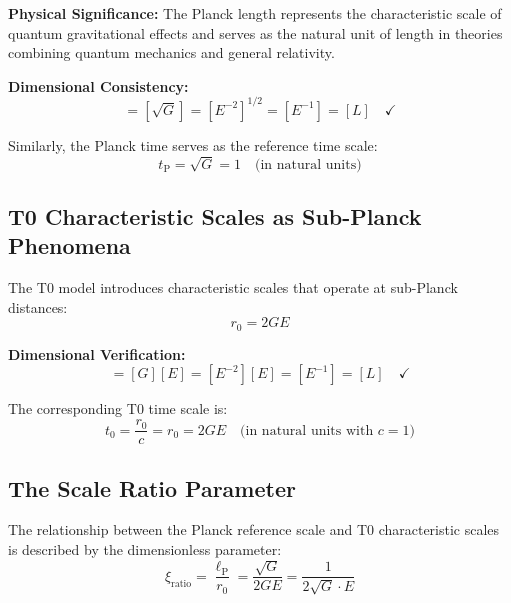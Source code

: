 \documentclass[12pt,a4paper]{report}
\newcommand{\lP}{\ell_{\text{P}}}         %
\newcommand{\tP}{t_{\text{P}}}            %
\newcommand{\rzero}{r_0}                  %
\newcommand{\tzero}{t_0}                  %
\newcommand{\xirat}{\xi_{\text{ratio}}}   %
\begin{document}
	\textbf{Physical Significance:} The Planck length represents the characteristic scale of quantum gravitational effects and serves as the natural unit of length in theories combining quantum mechanics and general relativity.
	
	\textbf{Dimensional Consistency:}
	\begin{equation}
		[\lP] = [\sqrt{G}] = [E^{-2}]^{1/2} = [E^{-1}] = [L] \quad \checkmark
	\end{equation}
	
	Similarly, the Planck time serves as the reference time scale:
	\begin{equation}
		\tP = \sqrt{G} = 1 \quad \text{(in natural units)}
	\end{equation}
	
	\subsection{T0 Characteristic Scales as Sub-Planck Phenomena}\label{subsec:t0_sub_planck}
	
	The T0 model introduces characteristic scales that operate at sub-Planck distances:
	\begin{equation}
		\boxed{\rzero = 2GE}
		\label{eq:t0_characteristic_length}
	\end{equation}
	
	\textbf{Dimensional Verification:}
	\begin{equation}
		[\rzero] = [G][E] = [E^{-2}][E] = [E^{-1}] = [L] \quad \checkmark
	\end{equation}
	
	The corresponding T0 time scale is:
	\begin{equation}
		\tzero = \frac{\rzero}{c} = \rzero = 2GE \quad \text{(in natural units with } c = 1\text{)}
	\end{equation}
	
\subsection{The Scale Ratio Parameter}\label{subsec:scale_ratio}

The relationship between the Planck reference scale and T0 characteristic scales is described by the dimensionless parameter:
\begin{equation}
	\boxed{\xirat = \frac{\lP}{\rzero} = \frac{\sqrt{G}}{2GE} = \frac{1}{2\sqrt{G} \cdot E}}
	\label{eq:scale_ratio}
\end{equation}
\end{document}
